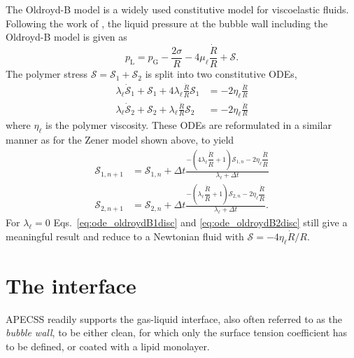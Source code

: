The Oldroyd-B model is a widely used constitutive model for viscoelastic fluids. 
Following the work of \citet{Jimenez-Fernandez2005}, the liquid pressure at the bubble wall including the Oldroyd-B model is given as
\begin{equation}
     p_\text{L} = p_\text{G} - \frac{2 \sigma}{R} - 4 \mu_\ell \frac{\dot{R}}{R} + \mathcal{S} \label{eq:pL_OldroydB}.
\end{equation}
The polymer stress $\mathcal{S} = \mathcal{S}_1 + \mathcal{S}_2$ is split into two constitutive ODEs,
\begin{align}
    \lambda_\ell \dot{\mathcal{S}}_1 + \mathcal{S}_1 + 4 \lambda_\ell \frac{\dot{R}}{R} \mathcal{S}_1 &= - 2 \eta_\ell \frac{\dot{R}}{R}\\  
    \lambda_\ell \dot{\mathcal{S}}_2 + \mathcal{S}_2 +  \lambda_\ell \frac{\dot{R}}{R} \mathcal{S}_2 &= - 2 \eta_\ell \frac{\dot{R}}{R}
\end{align}
where $\eta_\ell$ is the polymer viscosity.
These ODEs are reformulated in a similar manner as for the Zener model shown above, to yield
\begin{align}
    \mathcal{S}_{1,n+1} &= \mathcal{S}_{1,n} + \Delta t \frac{-\left(4 \lambda_\ell \dfrac{\dot{R}}{R}+1\right) \mathcal{S}_{1,n}- 2 \eta_\ell \dfrac{\dot{R}}{R}}{\lambda_\ell+\Delta t} \label{eq:ode_oldroydB1disc} \\
    \mathcal{S}_{2,n+1} &= \mathcal{S}_{2,n} + \Delta t \frac{-\left(\lambda_\ell \dfrac{\dot{R}}{R}+1\right) \mathcal{S}_{2,n}- 2 \eta_\ell \dfrac{\dot{R}}{R}}{\lambda_\ell+\Delta t}.\label{eq:ode_oldroydB2disc}
\end{align}
For $\lambda_\ell = 0$ Eqs.~\eqref{eq:ode_oldroydB1disc} and \eqref{eq:ode_oldroydB2disc} still give a meaningful result and reduce to a Newtonian fluid with $\mathcal{S} = - 4 \eta_\ell \dot{R}/R$.

\section{The interface}
\label{sec:interface}

APECSS readily supports the gas-liquid interface, also often referred to as the \textit{bubble wall},  to be either clean, for which only the surface tension coefficient has to be defined, or coated with a lipid monolayer.

\vspace{0.8em}

